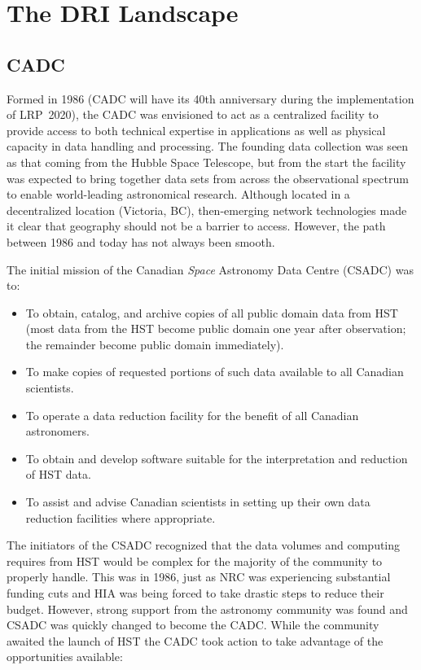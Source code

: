 \documentclass[11pt]{article}
\begin{document}
\section{The DRI Landscape}

\subsection{CADC}

Formed in 1986 (CADC will have its 40th anniversary during the implementation of LRP~2020), the CADC was envisioned to act as a centralized facility to provide access to both technical expertise in applications as well as physical capacity in data handling and processing. 
The founding data collection was seen as that coming from the Hubble Space Telescope, but from the start the facility was expected to bring together data sets from across the observational spectrum to enable world-leading astronomical research. 
Although located in a decentralized location (Victoria, BC), then-emerging network technologies made it clear that geography should not be a barrier to access.  However, the path between 1986 and today has not always been smooth.

The initial mission of the Canadian {\it Space} Astronomy Data Centre (CSADC) was to:
\begin{itemize}
\item To obtain, catalog, and archive copies of all public domain data from HST (most data from the HST become public domain one year after observation; the remainder become public domain immediately).
\item To make copies of requested portions of such data available to all Canadian scientists.
\item To operate a data reduction facility for the benefit of all Canadian astronomers.
\item To obtain and develop software suitable for the interpretation and reduction of HST data.
\item  To assist and advise Canadian scientists in setting up their own data reduction facilities where appropriate.
\end{itemize}

The initiators of the CSADC recognized that the data volumes and computing requires from HST would be complex for the majority of the community to properly handle.  This was in 1986, just as NRC was experiencing substantial funding cuts and HIA was being forced to take drastic steps to reduce their budget.  However, strong support from the astronomy community was found and CSADC was quickly changed to become the CADC.  While the community awaited the launch of HST the CADC took action to take advantage of the opportunities available:
\end{document}
